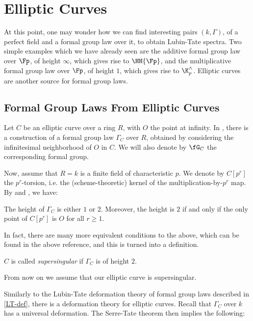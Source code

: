 \section{Elliptic Curves}

At this point, one may wonder how we can find interesting pairs $\left(k, \Gamma\right)$, of a perfect field and a formal group law over it, to obtain Lubin-Tate spectra.
Two simple examples which we have already seen are the additive formal group law over $\Fp$, of height $\infty$, which gives rise to $\HH{\Fp}$, and the multiplicative formal group law over $\Fp$, of height $1$, which gives rise to $\K_p^\wedge$.
Elliptic curves are another source for formal group laws.



\subsection{Formal Group Laws From Elliptic Curves}

Let $C$ be an elliptic curve over a ring $R$, with $O$ the point at infinity.
In \cite[IV]{Sil}, there is a construction of a formal group law $\Gamma_C$ over $R$, obtained by considering the infinitesimal neighborhood of $O$ in $C$.
We will also denote by $\fG_C$ the corresponding formal group.

Now, assume that $R = k$ is a finite field of characteristic $p$.
We denote by $C\left[p^r\right]$ the $p^r$-torsion, i.e. the (scheme-theoretic) kernel of the multiplication-by-$p^r$ map.
By \cite[IV.7.5]{Sil} and \cite[V.3.1]{Sil}, we have:

\begin{proposition}\label{height-torsion}
	The height of $\Gamma_C$ is either $1$ or $2$.
	Moreover, the height is $2$ if and only if the only point of $C\left[p^r\right]$ is $O$ for all $r \geq 1$.
\end{proposition}

In fact, there are many more equivalent conditions to the above, which can be found in the above reference, and this is turned into a definition.

\begin{definition}
	$C$ is called \emph{supersingular} if $\Gamma_C$ is of height $2$.
\end{definition}

From now on we assume that our elliptic curve is supersingular.

Similarly to the Lubin-Tate deformation theory of formal group laws described in \ref{LT-def}, there is a deformation theory for elliptic curves.
Recall that $\Gamma_C$ over $k$ has a universal deformation.
The Serre-Tate theorem \cite[2.9.1]{KM} then implies the following:

